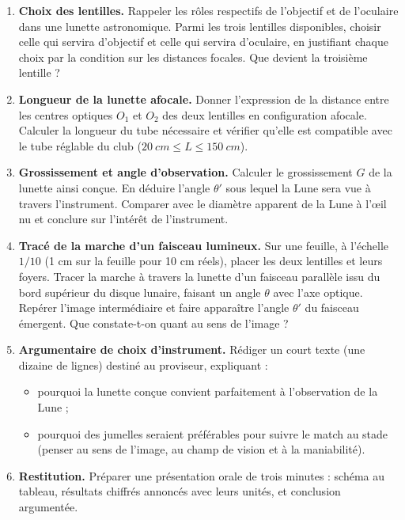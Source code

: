 \documentclass[11pt]{article}
\begin{document}
\begin{enumerate}
\item \textbf{Choix des lentilles.} Rappeler les rôles respectifs de l'objectif et de l'oculaire dans une lunette astronomique. Parmi les trois lentilles disponibles, choisir celle qui servira d'objectif et celle qui servira d'oculaire, en justifiant chaque choix par la condition sur les distances focales. Que devient la troisième lentille ?

\item \textbf{Longueur de la lunette afocale.} Donner l'expression de la distance entre les centres optiques $O_1$ et $O_2$ des deux lentilles en configuration afocale. Calculer la longueur du tube nécessaire et vérifier qu'elle est compatible avec le tube réglable du club ($\SI{20}{cm} \leq L \leq \SI{150}{cm}$).

\item \textbf{Grossissement et angle d'observation.} Calculer le grossissement $G$ de la lunette ainsi conçue. En déduire l'angle $\theta'$ sous lequel la Lune sera vue à travers l'instrument. Comparer avec le diamètre apparent de la Lune à l'œil nu et conclure sur l'intérêt de l'instrument.

\item \textbf{Tracé de la marche d'un faisceau lumineux.} Sur une feuille, à l'échelle $1/10$ (1 cm sur la feuille pour 10 cm réels), placer les deux lentilles et leurs foyers. Tracer la marche à travers la lunette d'un faisceau parallèle issu du bord supérieur du disque lunaire, faisant un angle $\theta$ avec l'axe optique. Repérer l'image intermédiaire et faire apparaître l'angle $\theta'$ du faisceau émergent. Que constate-t-on quant au sens de l'image ?

\item \textbf{Argumentaire de choix d'instrument.} Rédiger un court texte (une dizaine de lignes) destiné au proviseur, expliquant :
\begin{itemize}
\item pourquoi la lunette conçue convient parfaitement à l'observation de la Lune ;
\item pourquoi des jumelles seraient préférables pour suivre le match au stade (penser au sens de l'image, au champ de vision et à la maniabilité).
\end{itemize}

\item \textbf{Restitution.} Préparer une présentation orale de trois minutes : schéma au tableau, résultats chiffrés annoncés avec leurs unités, et conclusion argumentée.
\end{enumerate}
\end{document}
